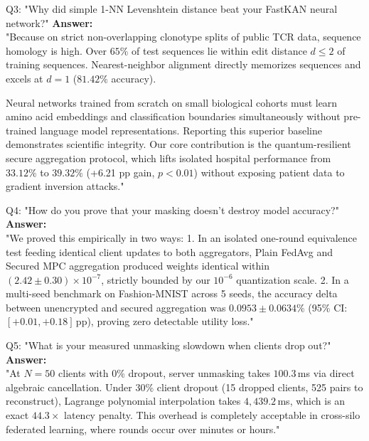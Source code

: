 \documentclass[11pt,a4paper]{report}
\begin{document}
\begin{infobox}{Q3: "Why did simple 1-NN Levenshtein distance beat your FastKAN neural network?"}
\textbf{Answer:} \\
"Because on strict non-overlapping clonotype splits of public TCR data, sequence homology is high. Over $65\%$ of test sequences lie within edit distance $d \le 2$ of training sequences. Nearest-neighbor alignment directly memorizes sequences and excels at $d=1$ ($81.42\%$ accuracy).

Neural networks trained from scratch on small biological cohorts must learn amino acid embeddings and classification boundaries simultaneously without pre-trained language model representations. Reporting this superior baseline demonstrates scientific integrity. Our core contribution is the quantum-resilient secure aggregation protocol, which lifts isolated hospital performance from $33.12\%$ to $39.32\%$ (+6.21 pp gain, $p < 0.01$) without exposing patient data to gradient inversion attacks."
\end{infobox}

\begin{infobox}{Q4: "How do you prove that your masking doesn't destroy model accuracy?"}
\textbf{Answer:} \\
"We proved this empirically in two ways:
1. In an isolated one-round equivalence test feeding identical client updates to both aggregators, Plain FedAvg and Secured MPC aggregation produced weights identical within $(2.42 \pm 0.30) \times 10^{-7}$, strictly bounded by our $10^{-6}$ quantization scale.
2. In a multi-seed benchmark on Fashion-MNIST across 5 seeds, the accuracy delta between unencrypted and secured aggregation was $0.0953 \pm 0.0634\%$ (95\% CI: $[+0.01, +0.18]$\,pp), proving zero detectable utility loss."
\end{infobox}

\begin{infobox}{Q5: "What is your measured unmasking slowdown when clients drop out?"}
\textbf{Answer:} \\
"At $N=50$ clients with 0\% dropout, server unmasking takes $100.3$\,ms via direct algebraic cancellation. Under 30\% client dropout (15 dropped clients, 525 pairs to reconstruct), Lagrange polynomial interpolation takes $4,439.2$\,ms, which is an exact $44.3\times$ latency penalty. This overhead is completely acceptable in cross-silo federated learning, where rounds occur over minutes or hours."
\end{infobox}
\end{document}
